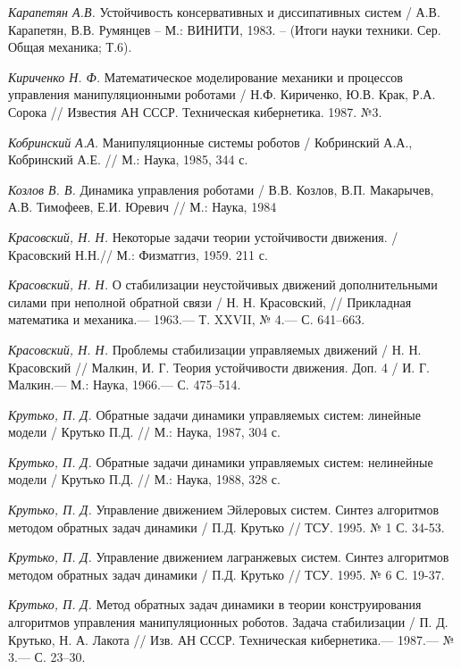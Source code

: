\begin{thebibliography}{10}
	{\it Карапетян А.В.} Устойчивость консервативных и диссипативных систем / А.В. Карапетян, В.В. Румянцев – М.: ВИНИТИ, 1983. – (Итоги науки  		техники. Сер. Общая механика; Т.6).
	
	{\it Кириченко Н. Ф.} Математическое моделирование механики и процессов управления манипуляционными роботами / Н.Ф. Кириченко, Ю.В. Крак, Р.А. Сорока // Известия АН СССР. Техническая кибернетика. 1987. №3.
	
	{\it Кобринский А.А.} Манипуляционные системы роботов / Кобринский А.А., Кобринский А.Е. // М.: Наука, 1985, 344 с.
	
	{\it Козлов В. В.} Динамика управления роботами / В.В. Козлов, В.П. Макарычев, А.В. Тимофеев, Е.И. Юревич // М.: Наука, 1984
	
	{\it Красовский, Н. Н.} Некоторые задачи теории устойчивости движения. / Красовский Н.Н.// М.:
	Физматгиз, 1959. 211 с.
	
	{\it Красовский, Н. Н.} О стабилизации неустойчивых движений дополнительными силами при неполной обратной связи / Н. Н. Красовский,
	// Прикладная математика и механика.— 1963.— Т. XXVII, № 4.— С. 641–663.
	
	{\it Красовский, Н. Н.} Проблемы стабилизации управляемых движений / Н. Н. Красовский
	// Малкин, И. Г. Теория устойчивости движения. Доп. 4 / И. Г. Малкин.— М.:
	Наука, 1966.— С. 475–514.
	
	{\it Крутько, П. Д.} Обратные задачи динамики управляемых систем: линейные модели / Крутько П.Д. // М.: Наука, 1987, 304 с.
	
	{\it Крутько, П. Д.} Обратные задачи динамики управляемых систем: нелинейные модели / Крутько П.Д. // М.: Наука, 1988, 328 с.
	
	{\it Крутько, П. Д.} Управление движением Эйлеровых систем. Синтез алгоритмов методом обратных задач динамики / П.Д. Крутько // ТСУ. 1995. № 1 С. 34-53.
	
	{\it Крутько, П. Д.} Управление движением лагранжевых систем. Синтез алгоритмов методом обратных задач динамики / П.Д. Крутько // ТСУ. 1995. № 6 С. 19-37.
	
	{\it Крутько, П. Д.} Метод обратных задач динамики в теории конструирования алгоритмов
	управления манипуляционных роботов. Задача стабилизации / П. Д. Крутько, Н. А. Лакота
	// Изв. АН СССР. Техническая кибернетика.— 1987.— № 3.— С. 23–30.


\end{thebibliography}
